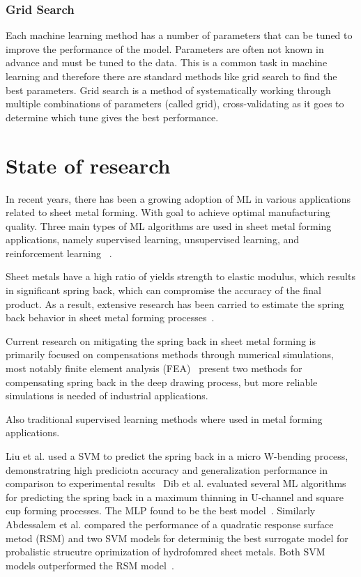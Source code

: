 \subsubsection{Grid Search}
Each machine learning method has a number of parameters that can be tuned to improve the
performance of the model. Parameters are often not known in advance and must be tuned
to the data.
This is a common task in machine learning and therefore there are standard methods like
grid
search to find the best parameters.
Grid search is a method of systematically working through multiple combinations of
parameters
(called grid), cross-validating as it goes to determine which tune gives the best
performance.
\cite[p. 260-275]{muller_introductionmachinelearning_2016}


\section{State of research}\label{sec:state-of-research}
In recent years, there has been a growing adoption of \ac{ML} in various applications
related to sheet metal forming. With goal to achieve optimal manufacturing quality.
Three main types of \ac{ML} algorithms are used in sheet metal forming applications,
namely supervised learning, unsupervised learning, and reinforcement learning~
\cite[p. 2]{cruz_applicationmachinelearning_2021}.

Sheet metals have a high ratio of yields strength to elastic modulus, which results in
significant spring back, which can compromise the accuracy of the final product.
As a result, extensive research has been carried to estimate the spring back behavior
in sheet metal forming processes~\cite[p. 565]{liu2021deep}.

Current research on mitigating the spring back in sheet metal forming is primarily
focused on compensations methods through numerical simulations, most notably finite
element analysis (FEA)~\cite[p. 565]{liu2021deep}
\cite{lingbeek2005development}  present two methods for compensating spring back in the
deep drawing process, but more reliable simulations is needed of industrial applications.

Also traditional supervised learning methods where used in metal forming applications.

Liu et al. used a \ac{SVM} to predict the spring back in a micro W-bending process,
demonstratring high prediciotn accuracy and generalization performance in comparison to
experimental results~\cite[p. 1]{liu_springbackpredictionforming_2019}
Dib et al. evaluated several \ac{ML} algorithms for predicting the spring back in a
maximum thinning in U-channel and square cup forming processes. The \ac{MLP} found to
be the best model~\cite{dib_singleensembleclassifiers_2020}.
Similarly Abdessalem et al. compared the performance of a quadratic response surface
metod (RSM) and two \ac{SVM} models for determinig the best surrogate model for
probalistic strucutre oprimization of hydrofomred sheet metals. Both \ac{SVM} models
outperformed the RSM model~\cite[]{abdessalem2015probabilistic}.

